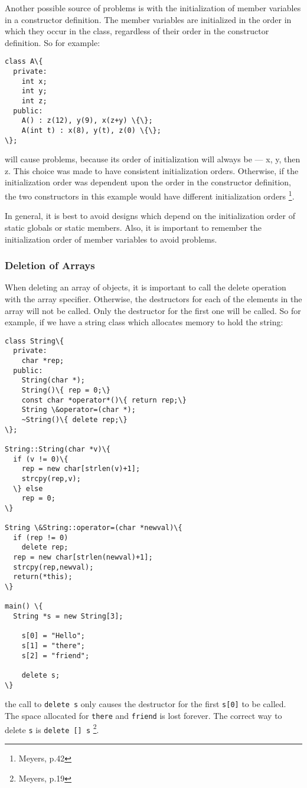 Another possible source of problems is with the initialization
of member variables in a constructor definition. The member variables are
initialized in the order in which they occur in the class, regardless of their
order in the constructor definition. So for example:
\begin{verbatim}
class A\{
  private:
    int x;
    int y;
    int z;
  public:
    A() : z(12), y(9), x(z+y) \{\};
    A(int t) : x(8), y(t), z(0) \{\};
\};
\end{verbatim}
\noindent
will cause problems, because its order of initialization will always be ---
x, y, then z. This choice was made to have consistent initialization orders. 
Otherwise, if the initialization order was dependent upon the order in the
constructor definition, the two constructors in this example would have
different initialization orders \footnote{Meyers, p.42}.

In general, it is best to avoid designs which depend on the initialization
order of static globals or static members. Also, it is important to remember
the initialization order of member variables to avoid problems.

\subsubsection{Deletion of Arrays}
When deleting an array of objects, it is important to call the delete 
operation with the array specifier. Otherwise, the destructors for each of the
elements in the array will not be called. Only the destructor for the first
one will be called. So for example, if we have a string class which allocates
memory to hold the string:
\begin{verbatim}
class String\{
  private:
    char *rep;
  public:
    String(char *);
    String()\{ rep = 0;\}
    const char *operator*()\{ return rep;\}
    String \&operator=(char *);
    ~String()\{ delete rep;\}
\};

String::String(char *v)\{
  if (v != 0)\{
    rep = new char[strlen(v)+1];
    strcpy(rep,v);
  \} else
    rep = 0;
\}

String \&String::operator=(char *newval)\{
  if (rep != 0)
    delete rep;
  rep = new char[strlen(newval)+1];
  strcpy(rep,newval);
  return(*this);
\}

main() \{
  String *s = new String[3];

    s[0] = "Hello";
    s[1] = "there";
    s[2] = "friend";

    delete s;
\}
\end{verbatim}
\noindent
the call to \texttt{delete s} only causes the destructor for the first
\texttt{s[0]} to be called. The space allocated for \texttt{there} and 
\texttt{friend} is lost forever. The correct way to delete \texttt{s} is 
\texttt{delete [] s} \footnote{Meyers, p.19}.

